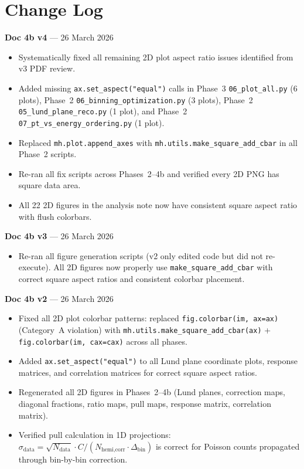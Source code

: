 \documentclass[11pt,a4paper]{article}
\begin{document}
\tableofcontents
\clearpage

\section*{Change Log}

\textbf{Doc 4b v4} --- 26 March 2026
\begin{itemize}
\item Systematically fixed all remaining 2D plot aspect ratio issues identified from v3 PDF review.
\item Added missing \texttt{ax.set\_aspect("equal")} calls in Phase~3 \texttt{06\_plot\_all.py} (6 plots), Phase~2 \texttt{06\_binning\_optimization.py} (3 plots), Phase~2 \texttt{05\_lund\_plane\_reco.py} (1 plot), and Phase~2 \texttt{07\_pt\_vs\_energy\_ordering.py} (1 plot).
\item Replaced \texttt{mh.plot.append\_axes} with \texttt{mh.utils.make\_square\_add\_cbar} in all Phase~2 scripts.
\item Re-ran all fix scripts across Phases~2--4b and verified every 2D PNG has square data area.
\item All 22 2D figures in the analysis note now have consistent square aspect ratio with flush colorbars.
\end{itemize}

\medskip

\textbf{Doc 4b v3} --- 26 March 2026
\begin{itemize}
\item Re-ran all figure generation scripts (v2 only edited code but did not re-execute). All 2D figures now properly use \texttt{make\_square\_add\_cbar} with correct square aspect ratios and consistent colorbar placement.
\end{itemize}

\medskip

\textbf{Doc 4b v2} --- 26 March 2026
\begin{itemize}
\item Fixed all 2D plot colorbar patterns: replaced \texttt{fig.colorbar(im, ax=ax)} (Category~A violation) with \texttt{mh.utils.make\_square\_add\_cbar(ax)} + \texttt{fig.colorbar(im, cax=cax)} across all phases.
\item Added \texttt{ax.set\_aspect("equal")} to all Lund plane coordinate plots, response matrices, and correlation matrices for correct square aspect ratios.
\item Regenerated all 2D figures in Phases~2--4b (Lund planes, correction maps, diagonal fractions, ratio maps, pull maps, response matrix, correlation matrix).
\item Verified pull calculation in 1D projections: $\sigma_\text{data} = \sqrt{N_\text{data}} \cdot C / (N_\text{hemi,corr} \cdot \Delta_\text{bin})$ is correct for Poisson counts propagated through bin-by-bin correction.
\end{itemize}
\end{document}
